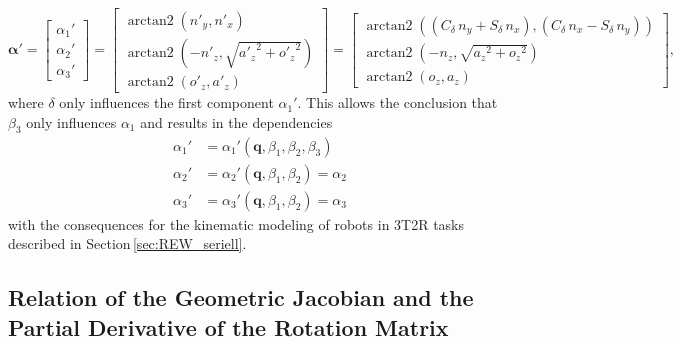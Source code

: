 \documentclass[robotics,article,accept,moreauthors,pdftex]{Definitions/mdpi}
\newcommand{\bm}[1]{\boldsymbol{#1}}
\DeclareMathOperator{\arctantwo}{arctan2}
\begin{document}
\begin{equation}
\bm{\alpha}'
=
\begin{bmatrix}
\alpha_1' \\
\alpha_2' \\
\alpha_3'
\end{bmatrix}
=
\begin{bmatrix}
\arctantwo \left( {n'_y} , { n'_x} \right) \\ 
\arctantwo \left( -{n'_z} , \sqrt {{{a'_z}}^{2}+{{ o'_z}}^{2}} \right) \\ 
\arctantwo \left( {o'_z} , {a'_z} \right)
\end{bmatrix}
=
\begin{bmatrix}
\arctantwo \left( ({ C_{\delta}}\,{n_y}+{ S_{\delta}}\,{n_x}) , ({ C_{\delta}}\,{n_x}-{ S_{\delta}}\,{n_y}) \right) \\
\arctantwo \left( -{n_z} , \sqrt {{{a_z}}^{2}+{{ o_z}}^{2}} \right) \\
\arctantwo \left( {o_z} , {a_z} \right)
\end{bmatrix},
\end{equation}
%
where $\delta$ only influences the first component $\alpha_1'$.
This allows the conclusion that $\beta_3$ only influences $\alpha_1$ and results in the dependencies
%
\begin{align}
    \alpha_1'&=\alpha_1'(\bm{q},\beta_1,\beta_2,\beta_3)\\
    \alpha_2'&=\alpha_2'(\bm{q},\beta_1,\beta_2) =\alpha_2\\
    \alpha_3'&=\alpha_3'(\bm{q},\beta_1,\beta_2) =\alpha_3
\end{align}
%
with the consequences for the kinematic modeling of robots in 3T2R tasks described in Section\,\ref{sec:REW_seriell}.

\subsection{Relation of the Geometric Jacobian and the Partial Derivative of the Rotation Matrix}
\label{sec:appendix_rotmatjacobian}

\end{document}
